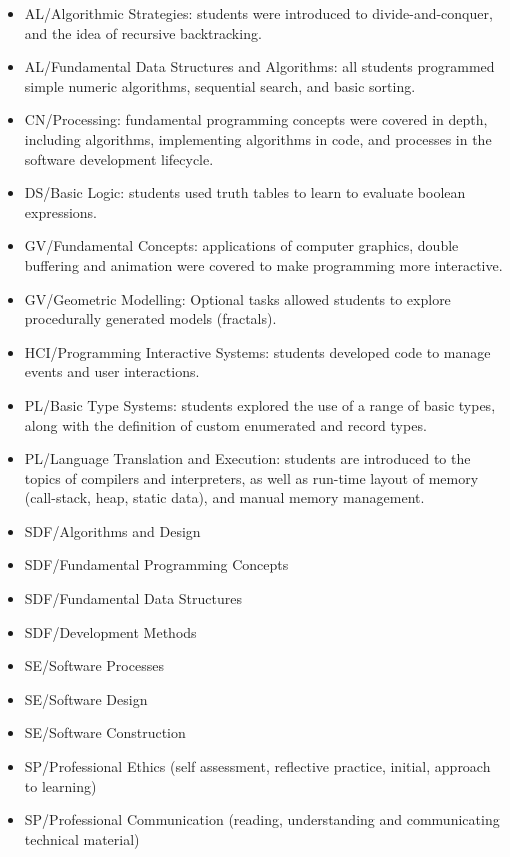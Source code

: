 \begin{itemize}[noitemsep,nolistsep]
	\item AL/Algorithmic Strategies: students were introduced to divide-and-conquer, and the idea of recursive backtracking.
	\item AL/Fundamental Data Structures and Algorithms: all students programmed simple numeric algorithms, sequential search, and basic sorting.
	\item CN/Processing: fundamental programming concepts were covered in depth, including algorithms,  implementing algorithms in code, and processes in the software development lifecycle.
	\item DS/Basic Logic: students used truth tables to learn to evaluate boolean expressions.
	\item GV/Fundamental Concepts: applications of computer graphics, double buffering and animation were covered to make programming more interactive.
	\item GV/Geometric Modelling: Optional tasks allowed students to explore procedurally generated models (fractals).
	\item HCI/Programming Interactive Systems: students developed code to manage events and user interactions.
	\item PL/Basic Type Systems: students explored the use of a range of basic types, along with the definition of custom enumerated and record types.
	\item PL/Language Translation and Execution: students are introduced to the topics of compilers and interpreters, as well as run-time layout of memory (call-stack, heap, static data), and manual memory management.
	\item SDF/Algorithms and Design
	\item SDF/Fundamental Programming Concepts
	\item SDF/Fundamental Data Structures
	\item SDF/Development Methods
	\item SE/Software Processes
	\item SE/Software Design
	\item SE/Software Construction
	\item SP/Professional Ethics (self assessment, reflective practice, initial, approach to learning)
	\item SP/Professional Communication (reading, understanding and communicating technical material)
\end{itemize}



